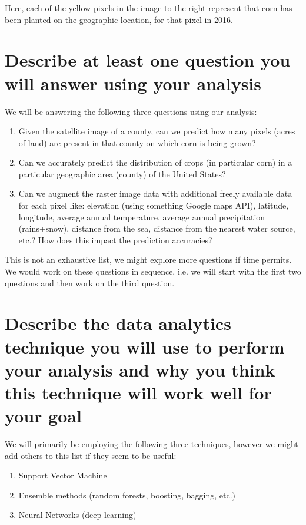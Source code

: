 \documentclass[10pt,letterpaper]{article}
\begin{document}
\noindent
Here, each of the yellow pixels in the image to the right represent that corn has been planted on the geographic location, for that pixel in 2016. 

\section{Describe at least one question you will answer using your analysis}


We will be answering the following three questions using our analysis:

\begin{enumerate}
	\item Given the satellite image of a county, can we predict how many pixels (acres of land) are present in that county on which corn is being grown?
	\item Can we accurately predict the distribution of crops (in particular corn) in a particular geographic area (county) of the United States?
	\item Can we augment the raster image data with additional freely available data for each pixel like: elevation (using something Google maps API), latitude, longitude, average annual temperature, average annual precipitation (rains+snow), distance from the sea, distance from the nearest water source, etc.? How does this impact the prediction accuracies?
\end{enumerate}

\noindent
This is not an exhaustive list, we might explore more questions if time permits. We would work on these questions in sequence, i.e. we will start with the first two questions and then work on the third question. 

\section{Describe the data analytics technique you will use to perform your analysis and why you think this technique will work well for your goal}

We will primarily be employing the following three techniques, however we might add others to this list if they seem to be useful:

\begin{enumerate}
	\item Support Vector Machine
	\item Ensemble methods (random forests, boosting, bagging, etc.)
	\item Neural Networks (deep learning)
\end{enumerate}
\end{document}

